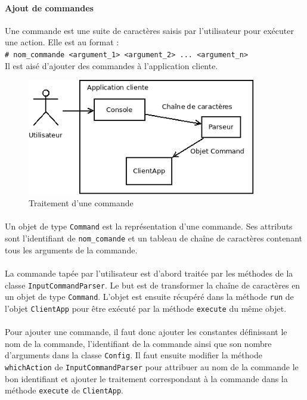 \documentclass[12pt]{article}
\newcommand{\class}[1]{\texttt{#1}}
\newcommand{\shellcmd}[1]{\\\indent\indent\texttt{\footnotesize\# #1}\\}
\begin{document}
\paragraph{Ajout de commandes} Une commande est une suite de caractères saisis par l'utilisateur pour exécuter une action. Elle est au format :
\shellcmd{nom\_commande <argument\_1> <argument\_2> ... <argument\_n> }
Il est aisé d'ajouter des commandes à l'application cliente.

\begin{figure}[h]
	\centering
		\includegraphics[width=10cm]{images/client/command.png}
	\caption{Traitement d'une commande \label{fig:commande}}
\end{figure}

\paragraph{} Un objet de type \class{Command} est la représentation d'une commande. 
Ses attributs sont l'identifiant de \texttt{nom\_comande} et un tableau de chaîne de caractères contenant tous les arguments de la commande.

\paragraph{} La commande tapée par l'utilisateur est d'abord traitée par les méthodes de la classe \class{InputCommandParser}.
Le but est de transformer la chaîne de caractères en un objet de type \class{Command}. L'objet est ensuite récupéré dans la méthode \class{run} de l'objet \class{ClientApp}
pour être exécuté par la méthode \texttt{execute} du même objet.

\paragraph{} Pour ajouter une commande, il faut donc ajouter les constantes définissant le nom de la commande, l'identifiant de la commande ainsi que son nombre d'arguments dans la classe \class{Config}.
Il faut ensuite modifier la méthode \class{whichAction} de \class{InputCommandParser} pour attribuer au nom de la commande le bon identifiant et ajouter le traitement correspondant à la commande
dans la méthode \class{execute} de \class{ClientApp}.
\end{document}
